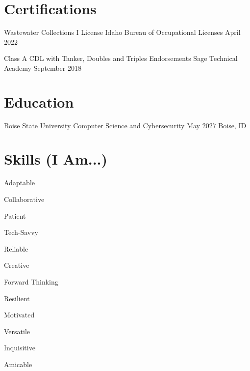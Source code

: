 \documentclass[letterpaper]{resume_config}
\begin{document}
\vspace{-10pt}

\section{Certifications}
\vspace{6pt}

\Certification
    {Wastewater Collections I License} %
    {Idaho Bureau of Occupational Licenses} %
    {April 2022} %

\vspace{10pt}
    
\Certification
    {Class A CDL with Tanker, Doubles and Triples Endorsements} %
    {Sage Technical Academy} %
    {September 2018} %

\vspace{-7pt}

\section{Education}

\EducationExperience
    {Boise State University} %
    {Computer Science and Cybersecurity} %
    {May 2027} %
    {Boise, ID} %

\vspace{-14pt}

\section{Skills (I Am...)}

\begin{SkillsList}
    \item Adaptable
    \item Collaborative
    \item Patient
    \item Tech-Savvy
    \item Reliable
    \item Creative
    \item Forward Thinking
    \item Resilient
    \item Motivated
    \item Versatile
    \item Inquisitive
    \item Amicable
\end{SkillsList}
\end{document}
